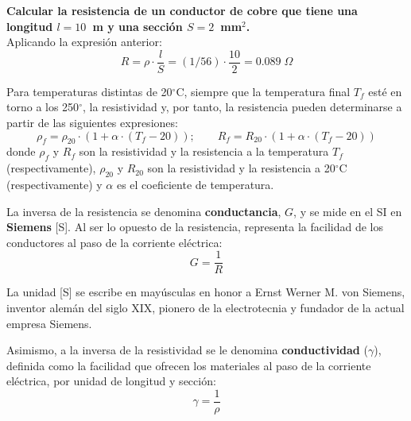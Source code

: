 \documentclass[11pt]{book} %
\begin{document}
	\vspace{4mm}
	\begin{example}
		\textbf{Calcular la resistencia de un conductor de cobre que tiene una longitud $l=10$~m y una sección $S=2$~mm$^2$.}\\
		Aplicando la expresión anterior: 
		\begin{equation*}
			R=\rho\cdot \dfrac{l}{S}=(1/56)\cdot \dfrac{10}{2}=0.089\;\Omega
		\end{equation*}
	\end{example}
	
	Para temperaturas distintas de 20$^\circ$C, siempre que la temperatura final $T_f$ esté en torno a los 250$^\circ$, la resistividad y, por tanto, la resistencia pueden determinarse a partir de las siguientes expresiones:
	\begin{equation*}
		\rho_f=\rho_{20}\cdot (1+\alpha\cdot (T_f-20)); \qquad
		R_f=R_{20}\cdot (1+\alpha\cdot (T_f-20))
	\end{equation*}
	donde $\rho_f$ y $R_f$ son la resistividad y la resistencia a la temperatura $T_f$ (respectivamente), $\rho_{20}$ y $R_{20}$ son la resistividad y la resistencia a 20$^\circ$C (respectivamente) y $\alpha$ es el coeficiente de temperatura. 
	
	La inversa de la resistencia se denomina \textbf{conductancia}, $G$, y se mide en el SI en \textbf{Siemens} [S]. Al ser lo opuesto de la resistencia, representa la facilidad de los conductores al paso de la corriente eléctrica:
	\begin{equation}
		\boxed{G=\dfrac{1}{R}}
	\end{equation}
	\begin{remark}
		La unidad [S] se escribe en mayúsculas en honor a Ernst Werner M. von Siemens, inventor alemán del siglo XIX, pionero de la electrotecnia y fundador de la actual empresa Siemens.
	\end{remark}
	Asimismo, a la inversa de la resistividad se le denomina \textbf{conductividad} ($\gamma$), definida como la facilidad que ofrecen los materiales al paso de la corriente eléctrica, por unidad de longitud y sección:
	\begin{equation*}
		\gamma=\dfrac{1}{\rho}
	\end{equation*}
	
\end{document}
